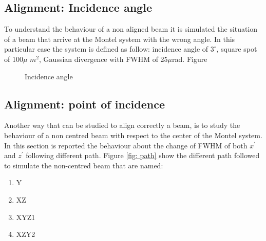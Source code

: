 \subsection{Alignment: Incidence angle}
To understand the behaviour of a non aligned beam it is simulated the situation of a beam that arrive at the Montel system with the wrong angle. In this particular case the system is defined as follow: incidence angle of $3^{\circ} $, square spot of 100$\mu $ $m^{2} $, Gaussian divergence with FWHM of 25$\mu $rad. Figure
\begin{figure}[]
%
\centering
%
%
\quad
%
\caption{Incidence angle}
%
\label{fig: incidence angle}
%
\end{figure}
\subsection{Alignment: point of incidence}
Another way that can be studied to align correctly a beam, is to study the behaviour of a non centred beam with respect to the center of the Montel system. In this section is reported the behaviour about the change of FWHM of both $x^{'} $ and $z^{'} $ following different path. Figure \ref{fig: path} show the different path followed to simulate the non-centred beam that are named:
\begin{enumerate}
	\item Y
	\item XZ
	\item XYZ1
	\item XZY2
\end{enumerate}


